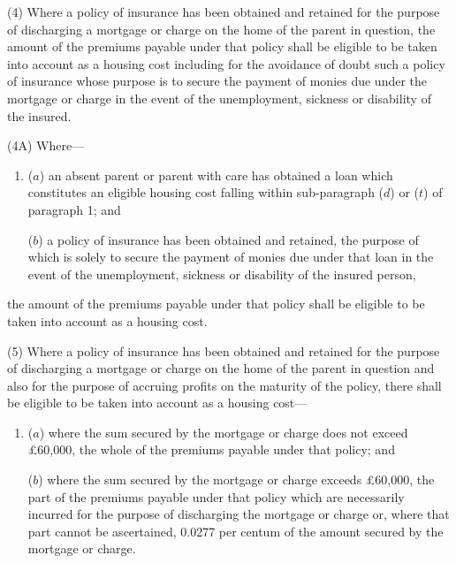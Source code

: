 \documentclass[12pt,a4paper]{article}
\begin{document}
(4) Where a policy of insurance has been obtained and retained for the purpose of discharging a mortgage or charge on the home of the parent in question, the amount of the 
premiums payable  %
under that policy shall be eligible to be taken into account as a housing cost
including for the avoidance of doubt such a policy of insurance whose purpose is to secure the payment of monies due under the mortgage or charge in the event of the unemployment, sickness or disability of the insured.  %

(4A) Where—
\begin{enumerate}\item[]
($a$) an absent parent or parent with care has obtained a loan which constitutes an eligible housing cost falling within sub-paragraph ($d$) or ($t$) of paragraph 1; and

($b$) a policy of insurance has been obtained and retained, the purpose of which is solely to secure the payment of monies due under that loan in the event of the unemployment, sickness or disability of the insured person,
\end{enumerate}
the amount of the premiums payable under that policy shall be eligible to be taken into account as a housing cost.


(5) Where a policy of insurance has been obtained and retained for the purpose of discharging a mortgage or charge on the home of the parent in question and also for the purpose of accruing profits on the maturity of the policy, there shall be eligible to be taken into account as a housing cost—
\begin{enumerate}\item[]
($a$) where the sum secured by the mortgage or charge does not exceed £60,000, the whole of the 
premiums payable  %
under that policy; and

($b$) where the sum secured by the mortgage or charge exceeds £60,000, the part of the 
premiums payable  %
under that policy which are necessarily incurred for the purpose of discharging the mortgage or charge or, where that part cannot be ascertained, 0.0277 per centum of the amount secured by the mortgage or charge.
\end{enumerate}
\end{document}
